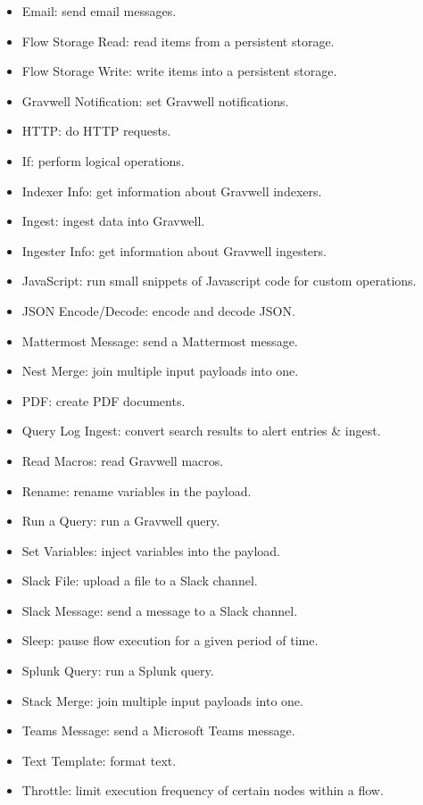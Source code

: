 \begin{itemize}
\item Email: send email messages.
\item Flow Storage Read: read items from a persistent storage.
\item Flow Storage Write: write items into a persistent storage.
\item Gravwell Notification: set Gravwell notifications.
\item HTTP: do HTTP requests.
\item If: perform logical operations.
\item Indexer Info: get information about Gravwell indexers.
\item Ingest: ingest data into Gravwell.
\item Ingester Info: get information about Gravwell ingesters.
\item JavaScript: run small snippets of Javascript code for custom operations.
\item JSON Encode/Decode: encode and decode JSON.
\item Mattermost Message: send a Mattermost message.
\item Nest Merge: join multiple input payloads into one.
\item PDF: create PDF documents.
\item Query Log Ingest: convert search results to alert entries \& ingest.
\item Read Macros: read Gravwell macros.
\item Rename: rename variables in the payload.
\item Run a Query: run a Gravwell query.
\item Set Variables: inject variables into the payload.
\item Slack File: upload a file to a Slack channel.
\item Slack Message: send a message to a Slack channel.
\item Sleep: pause flow execution for a given period of time.
\item Splunk Query: run a Splunk query.
\item Stack Merge: join multiple input payloads into one.
\item Teams Message: send a Microsoft Teams message.
\item Text Template: format text.
\item Throttle: limit execution frequency of certain nodes within a flow.
\end{itemize}

